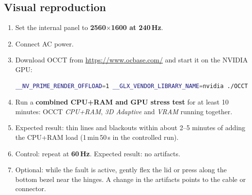 \documentclass[11pt,a4paper]{article}
\begin{document}
\subsection{Visual reproduction}
\begin{enumerate}
\item Set the internal panel to \textbf{2560$\times$1600 at 240\,Hz}.
\item Connect AC power.
\item Download OCCT from \url{https://www.ocbase.com/} and start it on the NVIDIA GPU:
\begin{lstlisting}[language=bash]
__NV_PRIME_RENDER_OFFLOAD=1 __GLX_VENDOR_LIBRARY_NAME=nvidia ./OCCT
\end{lstlisting}
\item Run a \textbf{combined CPU+RAM and GPU stress test} for at least 10 minutes: OCCT \emph{CPU+RAM}, \emph{3D Adaptive}
and \emph{VRAM} running together.
\item Expected result: thin lines and blackouts within about 2--5 minutes of adding the CPU+RAM load (1\,min\,50\,s in the controlled run).
\item Control: repeat at \textbf{60\,Hz}. Expected result: no artifacts.
\item Optional: while the fault is active, gently flex the lid or press along the bottom bezel near the hinges. A change in the
artifacts points to the cable or connector.
\end{enumerate}
\end{document}
